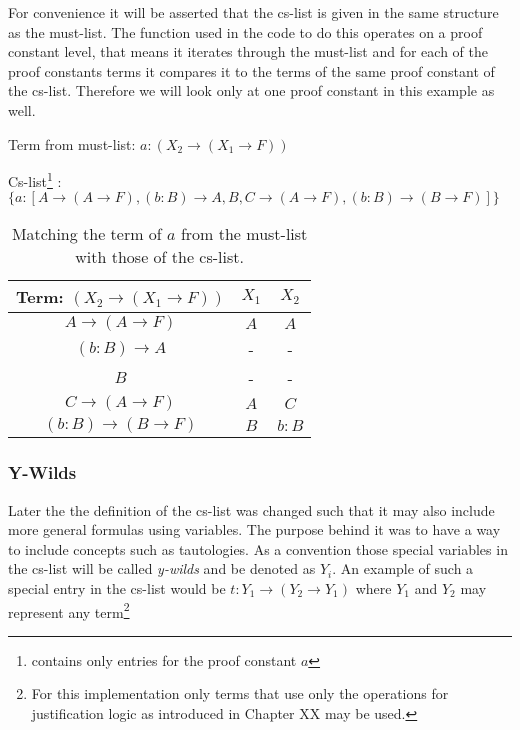 For convenience it will be asserted that the cs-list is given in the same structure as the must-list. The function used in the code to do this operates on a proof constant level, that means it iterates through the must-list and for each of the proof constants terms it compares it to the terms of the same proof constant of the cs-list. Therefore we will look only at one proof constant in this example as well.

\vspace{0.2cm}

Term from must-list: $a:(X_2\rightarrow (X_1 \rightarrow F))$

Cs-list\footnote{contains only entries for the proof constant $a$} : $\{a: [A \rightarrow (A \rightarrow F), (b:B) \rightarrow A, B, C \rightarrow (A \rightarrow F), (b:B) \rightarrow (B \rightarrow F)]\}$

\vspace{0.2cm}
\begin{table}[ht]
\centering
\begin{tabular}{ c || c c }
	Term: $(X_2\rightarrow (X_1 \rightarrow F))$	& $X_1$ & $X_2$ \\
	\hline
	$A \rightarrow (A \rightarrow F)$ 		& $A$ & $A$ \\
	$(b:B) \rightarrow A$ 					& - & - \\
	$B$ 										& - & - \\
	$C \rightarrow (A \rightarrow F)$ 		& $A$ & $C$\\
	$(b:B) \rightarrow (B \rightarrow F)$ 	& $B$ & $b:B$\\
\end{tabular}
\caption{Matching the term of $a$ from the must-list with those of the cs-list.}
\end{table}


\subsubsection{Y-Wilds}
Later the the definition of the cs-list was changed such that it may also include more general formulas using variables. The purpose behind it was to have a way to include concepts such as tautologies. As a convention those special variables in the cs-list will be called \emph{y-wilds} and be denoted as $Y_i$. An example of such a special entry in the cs-list would be $t:Y_1 \rightarrow (Y_2 \rightarrow Y_1)$ where $Y_1$ and $Y_2$ may represent any term\footnote{For this implementation only terms that use only the operations for justification logic as introduced in Chapter XX may be used.}


